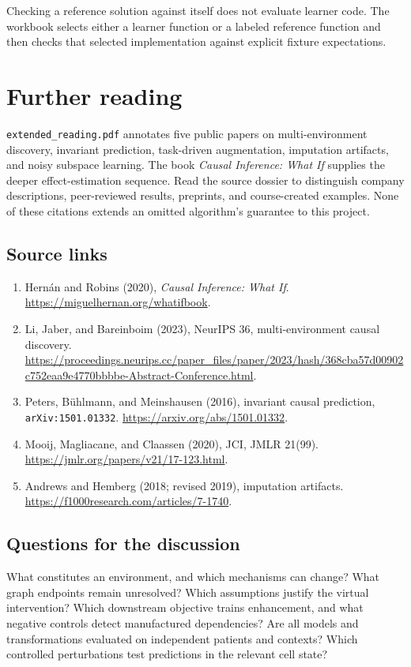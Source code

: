 \documentclass[11pt,oneside]{scrbook}
\begin{document}
\begin{pitfall}
Checking a reference solution against itself does not evaluate learner code. The
workbook selects either a learner function or a labeled reference function and then
checks that selected implementation against explicit fixture expectations.
\end{pitfall}

\chapter{Further reading}
\texttt{extended\_reading.pdf} annotates five public papers on multi-environment
discovery, invariant prediction, task-driven augmentation, imputation artifacts, and
noisy subspace learning. The book \emph{Causal Inference: What If} supplies the deeper
effect-estimation sequence. Read the source dossier to distinguish company descriptions,
peer-reviewed results, preprints, and course-created examples. None of these citations
extends an omitted algorithm's guarantee to this project.

\section{Source links}
\begin{enumerate}
\item Hern\'an and Robins (2020), \emph{Causal Inference: What If}.
\url{https://miguelhernan.org/whatifbook}.
\item Li, Jaber, and Bareinboim (2023), NeurIPS 36, multi-environment causal discovery.
\url{https://proceedings.neurips.cc/paper_files/paper/2023/hash/368cba57d00902c752eaa9e4770bbbbe-Abstract-Conference.html}.
\item Peters, B\"uhlmann, and Meinshausen (2016), invariant causal prediction,
\texttt{arXiv:1501.01332}. \url{https://arxiv.org/abs/1501.01332}.
\item Mooij, Magliacane, and Claassen (2020), JCI, JMLR 21(99).
\url{https://jmlr.org/papers/v21/17-123.html}.
\item Andrews and Hemberg (2018; revised 2019), imputation artifacts.
\url{https://f1000research.com/articles/7-1740}.
\end{enumerate}

\section{Questions for the discussion}
What constitutes an environment, and which mechanisms can change? What graph endpoints
remain unresolved? Which assumptions justify the virtual intervention? Which downstream
objective trains enhancement, and what negative controls detect manufactured dependencies?
Are all models and transformations evaluated on independent patients and contexts?
Which controlled perturbations test predictions in the relevant cell state?
\end{document}

